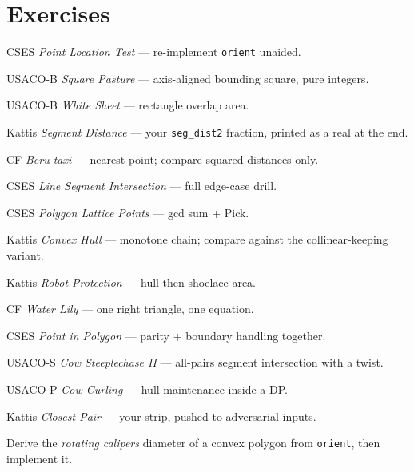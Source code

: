 \section*{Exercises}
\begin{exercise}[easy] CSES \emph{Point Location Test} --- re-implement \texttt{orient} unaided. \end{exercise}
\begin{exercise}[easy] USACO-B \emph{Square Pasture} --- axis-aligned bounding square, pure integers. \end{exercise}
\begin{exercise}[easy] USACO-B \emph{White Sheet} --- rectangle overlap area. \end{exercise}
\begin{exercise}[easy] Kattis \emph{Segment Distance} --- your \texttt{seg\_dist2} fraction, printed as a real at the end. \end{exercise}
\begin{exercise}[easy] CF \emph{Beru-taxi} --- nearest point; compare squared distances only. \end{exercise}
\begin{exercise}[medium] CSES \emph{Line Segment Intersection} --- full edge-case drill. \end{exercise}
\begin{exercise}[medium] CSES \emph{Polygon Lattice Points} --- gcd sum + Pick. \end{exercise}
\begin{exercise}[medium] Kattis \emph{Convex Hull} --- monotone chain; compare against the collinear-keeping variant. \end{exercise}
\begin{exercise}[medium] Kattis \emph{Robot Protection} --- hull then shoelace area. \end{exercise}
\begin{exercise}[medium] CF \emph{Water Lily} --- one right triangle, one equation. \end{exercise}
\begin{exercise}[medium] CSES \emph{Point in Polygon} --- parity + boundary handling together. \end{exercise}
\begin{exercise}[hard] USACO-S \emph{Cow Steeplechase II} --- all-pairs segment intersection with a twist. \end{exercise}
\begin{exercise}[hard] USACO-P \emph{Cow Curling} --- hull maintenance inside a DP. \end{exercise}
\begin{exercise}[hard] Kattis \emph{Closest Pair} --- your strip, pushed to adversarial inputs. \end{exercise}
\begin{exercise}[hard] Derive the \emph{rotating calipers} diameter of a convex polygon from \texttt{orient}, then implement it. \end{exercise}

